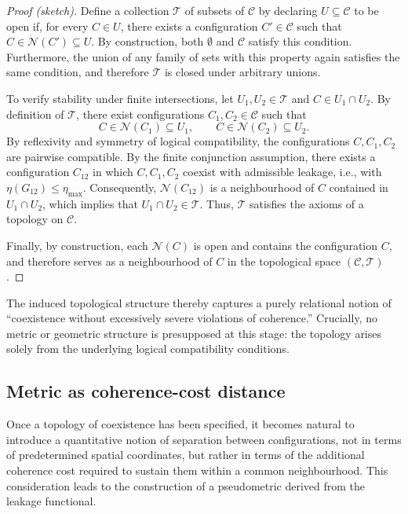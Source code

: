 \documentclass[11pt,a4paper]{article}
\theoremstyle{definition}
\newcommand{\Cconf}{\mathcal{C}} %
\begin{document}
\begin{proof}[Proof (sketch)]
Define a collection \(\mathscr{T}\) of subsets of \(\Cconf\) by declaring \(U \subseteq \Cconf\) to be open if, for every \(C \in U\), there exists a configuration \(C' \in \Cconf\) such that \(C \in \mathcal{N}(C') \subseteq U\). By construction, both \(\emptyset\) and \(\Cconf\) satisfy this condition. Furthermore, the union of any family of sets with this property again satisfies the same condition, and therefore \(\mathscr{T}\) is closed under arbitrary unions.

To verify stability under finite intersections, let \(U_1, U_2 \in \mathscr{T}\) and \(C \in U_1 \cap U_2\). By definition of \(\mathscr{T}\), there exist configurations \(C_1, C_2 \in \Cconf\) such that
\[
C \in \mathcal{N}(C_1) \subseteq U_1, \qquad C \in \mathcal{N}(C_2) \subseteq U_2.
\]
By reflexivity and symmetry of logical compatibility, the configurations \(C, C_1, C_2\) are pairwise compatible. By the finite conjunction assumption, there exists a configuration \(C_{12}\) in which \(C, C_1, C_2\) coexist with admissible leakage, i.e., with \(\eta(G_{12}) \leq \eta_{\mathrm{max}}\). Consequently, \(\mathcal{N}(C_{12})\) is a neighbourhood of \(C\) contained in \(U_1 \cap U_2\), which implies that \(U_1 \cap U_2 \in \mathscr{T}\). Thus, \(\mathscr{T}\) satisfies the axioms of a topology on \(\Cconf\).

Finally, by construction, each \(\mathcal{N}(C)\) is open and contains the configuration \(C\), and therefore serves as a neighbourhood of \(C\) in the topological space \((\Cconf,\mathscr{T})\).
\end{proof}

The induced topological structure thereby captures a purely relational notion of “coexistence without excessively severe violations of coherence.” Crucially, no metric or geometric structure is presupposed at this stage: the topology arises solely from the underlying logical compatibility conditions.

\subsection{Metric as coherence-cost distance}

Once a topology of coexistence has been specified, it becomes natural to introduce a quantitative notion of separation between configurations, not in terms of predetermined spatial coordinates, but rather in terms of the additional coherence cost required to sustain them within a common neighbourhood. This consideration leads to the construction of a pseudometric derived from the leakage functional.
\end{document}
